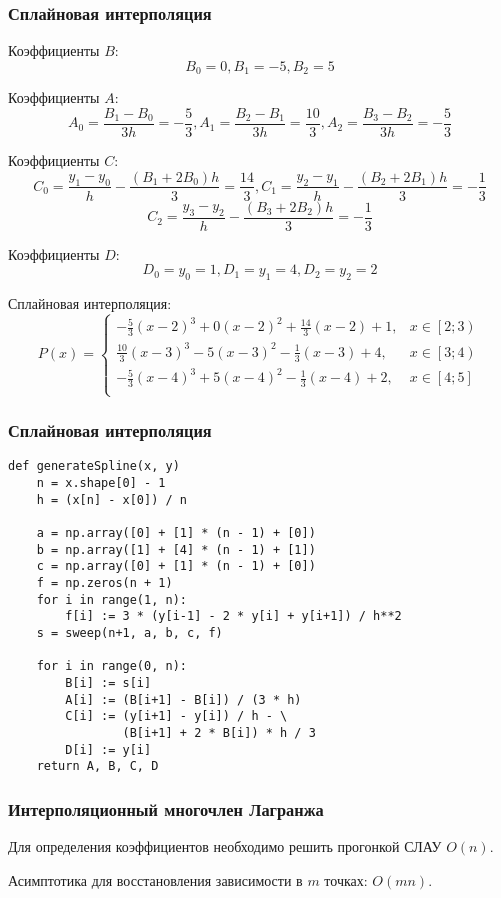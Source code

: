 \documentclass[10pt]{beamer}
\begin{document}
\begin{frame}[fragile]
\frametitle{Сплайновая интерполяция}

Коэффициенты $B$:
$$ B_0 = 0, B_1 = -5,  B_2 = 5$$

Коэффициенты $A$:
$$ A_0 = \frac{B_{1} - B_{0}}{3 h} = -\frac53,  A_1 = \frac{B_{2} - B_{1}}{3 h} = \frac{10}{3},  A_2 = \frac{B_{3} - B_{2}}{3 h} = -\frac{5}{3}$$

Коэффициенты $C$:
$$ C_0 = \frac{y_1 - y_0}{h} - \frac{(B_1 + 2 B_0) h}{3}= \frac{14}{3} ,  C_1 = \frac{y_2 - y_1}{h} - \frac{(B_2 + 2 B_1) h}{3} = -\frac13$$
$$C_2 = \frac{y_3 - y_2}{h} - \frac{(B_3 + 2 B_2) h}{3} = -\frac13$$

Коэффициенты $D$:
$$ D_0 = y_0 = 1,  D_1 = y_1 = 4,  D_2 = y_2 = 2$$

Сплайновая интерполяция:
$$
P(x) = 
\begin{cases}
-\frac{5}{3}(x-2)^3+0(x-2)^2 + \frac{14}{3}(x-2)+1, & x \in \left[2;3\right) \\
\frac{10}{3}\left(x-3\right)^3 - 5\left(x-3\right)^2 -\frac13\left(x-3\right) + 4,& x \in \left[3;4\right)	\\
-\frac{5}{3}\left(x-4\right)^3 + 5\left(x-4\right)^2 -\frac13\left(x-4\right) + 2,& x \in \left[4;5\right]	\\
\end{cases}
$$
\end{frame}

\begin{frame}[fragile]
\frametitle{Сплайновая интерполяция}

\begin{lstlisting}
def generateSpline(x, y)
	n = x.shape[0] - 1
    h = (x[n] - x[0]) / n

    a = np.array([0] + [1] * (n - 1) + [0])
    b = np.array([1] + [4] * (n - 1) + [1])
    c = np.array([0] + [1] * (n - 1) + [0])
    f = np.zeros(n + 1)
    for i in range(1, n):
        f[i] := 3 * (y[i-1] - 2 * y[i] + y[i+1]) / h**2
    s = sweep(n+1, a, b, c, f)

    for i in range(0, n):
        B[i] := s[i]
        A[i] := (B[i+1] - B[i]) / (3 * h)
        C[i] := (y[i+1] - y[i]) / h - \
                (B[i+1] + 2 * B[i]) * h / 3
        D[i] := y[i]
    return A, B, C, D
\end{lstlisting}


\end{frame}

\begin{frame}[fragile]
\frametitle{Интерполяционный многочлен Лагранжа}

Для определения коэффициентов необходимо решить прогонкой СЛАУ $O(n)$. 

\vfill

Асимптотика для восстановления зависимости в $m$ точках: $O(m n)$. 

\end{frame}
\end{document}
